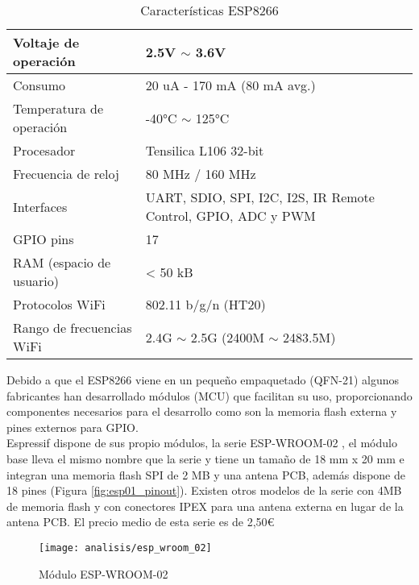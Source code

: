\documentclass[../proyecto.tex]{subfiles}
\begin{document}
\begin{table}[!h]
\centering
\begin{tabular}{ |l|m{20em}| }
\hline
Voltaje de operación      & 2.5V $\sim$ 3.6V          \\ \hline
Consumo                   & 20 uA - 170 mA (80 mA avg.)  \\ \hline
Temperatura de operación  & -40°C $\sim$ 125°C        \\ \hline
Procesador                & Tensilica L106 32-bit     \\ \hline
Frecuencia de reloj       & 80 MHz / 160 MHz          \\ \hline
Interfaces                & UART, SDIO, SPI, I2C, I2S, IR Remote Control, GPIO, ADC y PWM                           \\ \hline
GPIO pins                 & 17                        \\ \hline
RAM (espacio de usuario)  & < 50 kB                     \\ \hline
Protocolos WiFi           & 802.11 b/g/n (HT20)       \\ \hline
Rango de frecuencias WiFi & 2.4G $\sim$ 2.5G (2400M $\sim$ 2483.5M) \\ \hline
\end{tabular}
\caption{Características ESP8266}
\label{table:caracteristicas_esp8266}
\end{table}

Debido a que el ESP8266 viene en un pequeño empaquetado (QFN-21) algunos fabricantes han desarrollado módulos (MCU) que facilitan su uso, proporcionando componentes necesarios para el desarrollo como son la memoria flash externa y pines externos para GPIO.\\

Espressif dispone de sus propio módulos, la serie ESP-WROOM-02 \cite{espwroom02_overview}, el módulo base \cite{espwroom02_datasheet} lleva el mismo nombre que la serie y tiene un tamaño de 18 mm x 20 mm e integran una memoria flash SPI de 2 MB y una antena PCB, además dispone de 18 pines (Figura \ref{fig:esp01_pinout}). Existen otros modelos de la serie con 4MB de memoria flash y con conectores IPEX para una antena externa en lugar de la antena PCB. El precio medio de esta serie es de 2,50€ \cite{espressif_provider_digikey} \cite{espressif_provider_mouser}\\

\begin{figure}[h]
\centering
\texttt{[image: analisis/esp\_wroom\_02]}
\caption{Módulo ESP-WROOM-02}
\label{fig:esp_wrom_02}
\end{figure}
\end{document}
